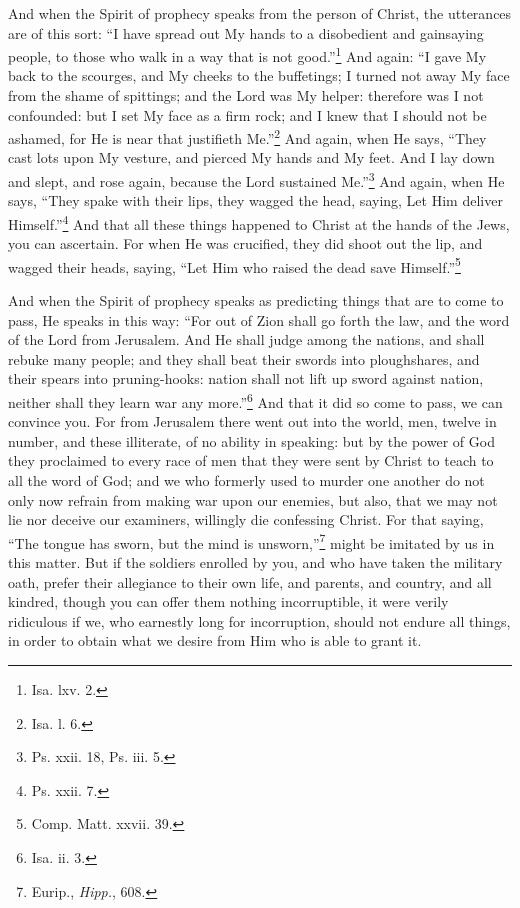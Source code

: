 
And when the Spirit of prophecy speaks from the person of Christ, the utterances are of this sort: “I have spread out My hands to a disobedient and gainsaying people, to those who walk in a way that is not good.”\footnote{Isa. lxv. 2.} And again: “I gave My back to the scourges, and My cheeks to the buffetings; I turned not away My face from the shame of spittings; and the Lord was My helper: therefore was I not confounded: but I set My face as a firm rock; and I knew that I should not be ashamed, for He is near that justifieth Me.”\footnote{Isa. l. 6.} And again, when He says, “They cast lots upon My vesture, and pierced My hands and My feet. And I lay down and slept, and rose again, because the Lord sustained Me.”\footnote{Ps. xxii. 18, Ps. iii. 5.} And again, when He says, “They spake with their lips, they wagged the head, saying, Let Him deliver Himself.”\footnote{Ps. xxii. 7.} And that all these things happened to Christ at the hands of the Jews, you can ascertain. For when He was crucified, they did shoot out the lip, and wagged their heads, saying, “Let Him who raised the dead save Himself.”\footnote{Comp. Matt. xxvii. 39.}


And when the Spirit of prophecy speaks as predicting things that are to come to pass, He speaks in this way: “For out of Zion shall go forth the law, and the word of the Lord from Jerusalem. And He shall judge among the nations, and shall rebuke many people; and they shall beat their swords into ploughshares, and their spears into pruning-hooks: nation shall not lift up sword against nation, neither shall they learn war any more.”\footnote{Isa. ii. 3.} And that it did so come to pass, we can convince you. For from Jerusalem there went out into the world, men, twelve in number, and these illiterate, of no ability in speaking: but by the power of God they proclaimed to every race of men that they were sent  by Christ to teach to all the word of God; and we who formerly used to murder one another do not only now refrain from making war upon our enemies, but also, that we may not lie nor deceive our examiners, willingly die confessing Christ. For that saying, “The tongue has sworn, but the mind is unsworn,”\footnote{Eurip., \emph{Hipp.}, 608.} might be imitated by us in this matter. But if the soldiers enrolled by you, and who have taken the military oath, prefer their allegiance to their own life, and parents, and country, and all kindred, though you can offer them nothing incorruptible, it were verily ridiculous if we, who earnestly long for incorruption, should not endure all things, in order to obtain what we desire from Him who is able to grant it.

